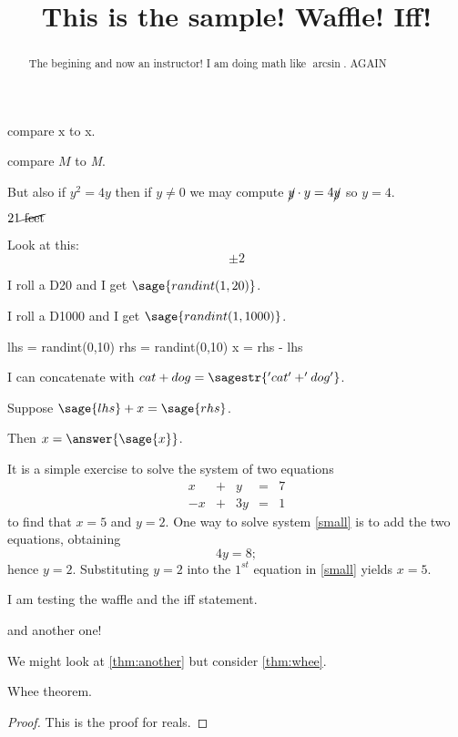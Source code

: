 \documentclass{ximera}
\title[Breal-grond]{This is the sample! Waffle!  Iff!}
\makeatletter
\newcommand{\makerandom}{}
\newcommand{\makerandom}{%
  \ST@wsf{jobname="\currfilebase"}%
  \ST@wsf{import hashlib}%
  \ST@wsf{set_random_seed(int(hashlib.sha256(jobname.encode('utf-8')).hexdigest(), 16))}%
}
\makeatother
\begin{document}
\begin{abstract}
  The begining and now an instructor! I am doing math like $\arcsin$. AGAIN
\end{abstract}

\maketitle
\makerandom

compare $\mathrm{x}$ to x.

compare $M$ to \textit{M}.

But also if $y^2 = 4y$ then if $y \neq 0$ we may compute $\cancel{y} \cdot y = 4 \cancel{y}$ so $y = 4$.

$21 \cancel{\textrm{ feet}}$

Look at this:
\[
  \pm 2
\]

I roll a D20 and I get $\sage{randint(1,20)}$.

I roll a D1000 and I get $\sage{randint(1,1000)}$.


\begin{sagesilent}
  lhs = randint(0,10)
  rhs = randint(0,10)
  x = rhs - lhs
\end{sagesilent}

I can concatenate with $cat + dog = \sagestr{'cat' + 'dog'}$.

\begin{problem}
  Suppose $\sage{lhs} + x = \sage{rhs}$.

  Then $x = \answer{\sage{x}}$.
\end{problem}

It is a simple exercise to solve the system of two equations
\begin{equation} \label{small}
\begin{array}{rcrcr}
 x & + & y & = & 7 \\
-x & + & 3y & = & 1
\end{array}
\end{equation}
to find that $x=5$ and $y=2$.  One way to solve
system \eqref{small} is to add the two equations, obtaining
\[
4y=8;
\]
hence $y=2$.  Substituting $y=2$ into the $1^{st}$ equation in
\ref{small} yields $x=5$.


I am testing the waffle and the iff statement.



and another one!



We might look at \ref{thm:another} but consider \ref{thm:whee}.

\begin{theorem}
  \label{thm:whee}  Whee theorem.
\end{theorem}
\begin{proof}
This is the proof for reals.
\end{proof}
\end{document}
